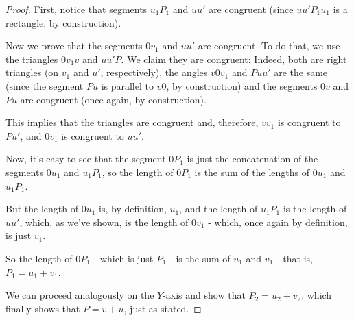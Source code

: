 \begin{proof}
First, notice that segments $u_1P_1$ and $uu'$ are congruent (since $uu'P_1u_1$ is a rectangle, by construction).

Now we prove that the segments $0v_1$ and $uu'$ are congruent. To do that, we use the triangles $0v_1v$ and $uu'P$. We claim they are congruent: Indeed, both are right triangles (on $v_1$ and $u'$, respectively), the angles $v0v_1$ and $Puu'$ are the same (since the segment $Pu$ is parallel to $v0$, by construction) and the segments $0v$ and $Pu$ are congruent (once again, by construction).

This implies that the triangles are congruent and, therefore, $vv_1$ is congruent to $Pu'$, and $0v_1$ is congruent to $uu'$.

Now, it's easy to see that the segment $0P_1$ is just the concatenation of the segments $0u_1$ and $u_1P_1$, so the length of $0P_1$ is the sum of the lengths of $0u_1$ and $u_1P_1$.

But the length of $0u_1$ is, by definition, $u_1$, and the length of $u_1P_1$ is the length of $uu'$, which, as we've shown, is the length of $0v_1$ - which, once again by definition, is just $v_1$.

So the length of $0P_1$ - which is just $P_1$ - is the sum of $u_1$ and $v_1$ - that is, $P_1=u_1+v_1$.

\bigskip
We can proceed analogously on the $Y$-axis and show that $P_2=u_2+v_2$, which finally shows that $P=v+u$, just as stated.
\end{proof}


